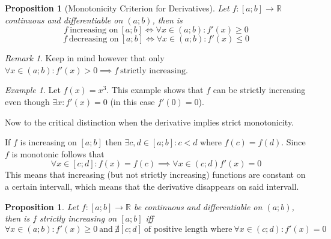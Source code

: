 \documentclass[english,titlepage]{uzhpub}
\theoremstyle{definition}
\theoremstyle{plain}
\newtheorem{proposition}[definition]{Proposition}
\theoremstyle{remark}
\newtheorem*{remark}{Remark}
\theoremstyle{example}
\newtheorem*{example}{Example}
\begin{document}
   \begin{proposition}[Monotonicity Criterion for Derivatives]\label{pro:pos_derivative=increasing}
      Let \(f: [a; b] \to \mathbb{R}\) continuous and differentiable on \((a; b)\), then is
      \[f~\text{increasing on}~[a;b] \iff \forall x \in (a; b): f'(x) \geq 0\]
      \[f~\text{decreasing on}~[a;b] \iff \forall x \in (a; b): f'(x) \leq 0\]
   \end{proposition}
   \begin{remark}
      Keep in mind however that only \(\forall x \in (a; b): f'(x) > 0 \implies f~\text{strictly increasing}\).
   \end{remark}
   \begin{example}
      Let \(f(x) = x^3\).
      This example shows that \(f\) can be strictly increasing even though \(\exists x: f'(x) = 0\) (in this case \(f'(0) = 0\)).

      Now to the critical distinction when the derivative implies strict monotonicity.

      If \(f\) is increasing on \([a; b]\) then \(\exists c, d \in [a; b]: c < d\) where \(f(c) = f(d)\).
      Since \(f\) is monotonic follows that
      \[\forall x \in [c; d]: f(x) = f(c) \implies \forall x \in (c; d) f'(x) = 0\]
      This means that increasing (but not strictly increasing) functions are constant on a certain intervall, which means that the derivative disappears on said intervall.
   \end{example}

   \begin{proposition}
      Let \(f: [a;b] \to \mathbb{R}\) be continuous and differentiable on \((a; b)\), then is \(f\) strictly increasing on \([a;b]\) iff
      \[\forall x \in (a; b): f'(x) \geq 0~\text{and}~\nexists [c;d]~\text{of positive length where}~\forall x \in (c; d): f'(x) = 0\]
   \end{proposition}
\end{document}
